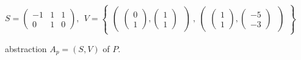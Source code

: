 
\begin{figure}
\[
    S = \begin{pmatrix}
        -1 & 1 & 1 \\
        0 & 1 & 0
    \end{pmatrix}, \ \
    V = \begin{Bmatrix}
        \begin{pmatrix}
              \begin{pmatrix}
                    0 \\
                    1
               \end{pmatrix},
               \begin{pmatrix}
                     1 \\
                     1
               \end{pmatrix}
        \  \end{pmatrix}\ , \
        \begin{pmatrix}
               \begin{pmatrix}
                    1 \\
                    1
               \end{pmatrix},
               \begin{pmatrix}
                    -5 \\
                    -3
              \end{pmatrix}
        \ \end{pmatrix}
    \end{Bmatrix}
\]
\caption{\qvasr abstraction $A_p = (S, V)$ of $P$.}
\end{figure}